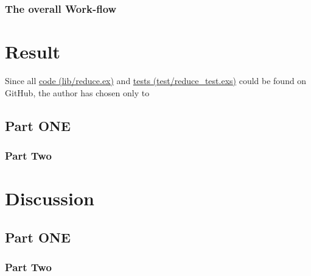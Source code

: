 \documentclass[a4paper,11pt]{article}
\begin{document}
\subsubsection*{The overall Work-flow}
\label{subsec:workflow}

\section*{Result}
\label{sec:result}
Since all
\href{https://github.com/VincentFerrigan/kth-id1019-programming-ii/tree/main/tasks/4/reduce/lib/reduce.ex}{code (lib/reduce.ex)} and %
\href{https://github.com/VincentFerrigan/kth-id1019-programming-ii/tree/main/tasks/4/reduce/test/reduce_test.exs}{tests (test/reduce\_test.exs)}
could be found on GitHub, the author has chosen only to %

%
%

\subsection*{Part ONE}
\label{subsec:res-part1}

\subsubsection*{Part Two}
\label{subsec:res-part2}

\section*{Discussion}
\label{sec:discussion}

\subsection*{Part ONE}
\label{subsec:dis-part1}

\subsubsection*{Part Two}
\label{subsec:dis-part2}
\end{document}
